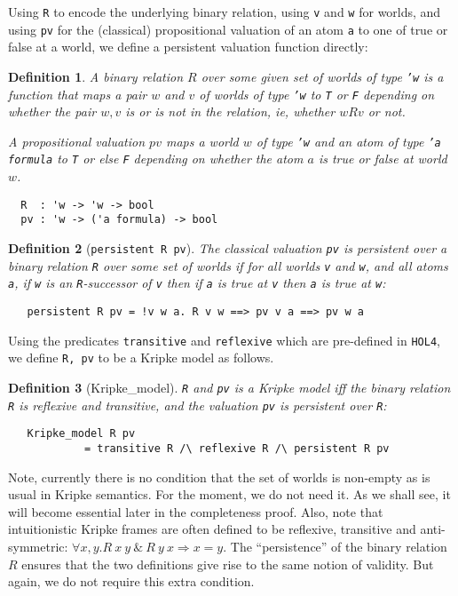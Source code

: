\documentclass[a4paper]{article}
\newtheorem{definition}{Definition}
\newcommand{\hol}{\texttt{HOL4}}
\begin{document}
Using \texttt{R} to encode the underlying binary relation, using
\texttt{v} and \texttt{w} for worlds, and using \texttt{pv} for the
(classical) propositional valuation of an atom \texttt{a} to one of true or
false at a world, we define a persistent valuation function
directly:
\begin{definition}
 A binary relation $R$ over some given set of worlds of type
 \texttt{'w} is a function that maps a pair $w$ and $v$ of worlds
 of type \texttt{'w} to \texttt{T} or \texttt{F} depending on
 whether the pair $w,v$ is or is not in the relation,
 ie, whether $wRv$ or not.

 A propositional valuation $pv$ maps a 
 world $w$ of type \texttt{'w} and an atom of type \texttt{'a formula}
 to 
\texttt{T} or else \texttt{F} depending on
 whether the atom $a$ is true or false at world $w$.
\begin{verbatim}
  R  : 'w -> 'w -> bool
  pv : 'w -> ('a formula) -> bool
\end{verbatim}
\end{definition}

\begin{definition}[\texttt{persistent R pv}]
 The classical valuation \texttt{pv} is persistent over a binary
 relation \texttt{R} over some set of worlds if for all worlds
 \texttt{v} and \texttt{w}, and all atoms \texttt{a}, 
 if \texttt{w} is an \texttt{R}-successor of \texttt{v} 
 then if \texttt{a} is true at \texttt{v} then 
 \texttt{a} is true at \texttt{w}:
\begin{verbatim}
   persistent R pv = !v w a. R v w ==> pv v a ==> pv w a
\end{verbatim}
\end{definition}

Using the predicates \texttt{transitive} and \texttt{reflexive} which
are pre-defined in \hol, we define \texttt{R, pv} to be a Kripke model
as follows.
\begin{definition}[Kripke\_model]
\texttt{R} and \texttt{pv} is a Kripke model iff 
the binary relation \texttt{R} is reflexive and
transitive, and the valuation \texttt{pv} is persistent over
\texttt{R}:
\begin{verbatim}
   Kripke_model R pv 
            = transitive R /\ reflexive R /\ persistent R pv 
\end{verbatim}
\end{definition}

Note, currently there is no condition that the set of worlds is
non-empty as is usual in Kripke semantics. For the moment, we do not
need it. As we shall see, it will become essential later in the
completeness proof. Also, note that intuitionistic Kripke frames are
often defined to be reflexive, transitive and anti-symmetric: 
$\forall x, y. R~ x~ y ~\&~ R~ y~ x \Longrightarrow x = y$. 
The ``persistence'' of the binary relation $R$ ensures that the two
definitions give rise to the same notion of validity. But again, we
do not require this extra condition.
\end{document}
